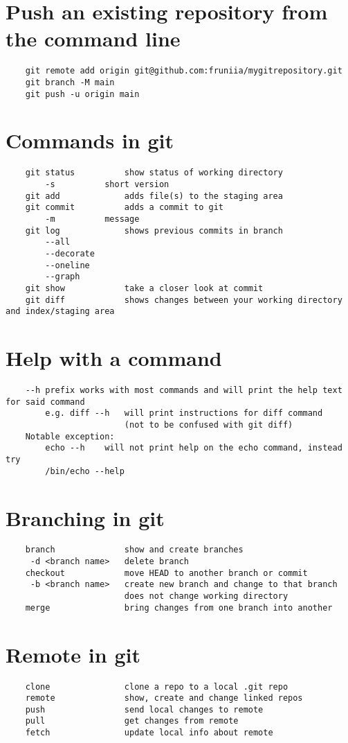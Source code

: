\documentclass[10pt, a4paper]{article}
\begin{document}
\section*{Push an existing repository from the command line}
\begin{verbatim}
    git remote add origin git@github.com:fruniia/mygitrepository.git
    git branch -M main
    git push -u origin main
\end{verbatim}
\newpage
\section*{Commands in git}
\begin{verbatim}
    git status          show status of working directory
        -s          short version
    git add             adds file(s) to the staging area
    git commit          adds a commit to git
        -m          message
    git log             shows previous commits in branch
        --all
        --decorate
        --oneline
        --graph
    git show            take a closer look at commit
    git diff            shows changes between your working directory and index/staging area
\end{verbatim}
\section*{Help with a command}
\begin{verbatim}
    --h prefix works with most commands and will print the help text for said command
        e.g. diff --h   will print instructions for diff command 
                        (not to be confused with git diff)
    Notable exception:
        echo --h    will not print help on the echo command, instead try
        /bin/echo --help    
\end{verbatim}
\section*{Branching in git}
\begin{verbatim}
    branch              show and create branches
     -d <branch name>   delete branch          
    checkout            move HEAD to another branch or commit
     -b <branch name>   create new branch and change to that branch
                        does not change working directory
    merge               bring changes from one branch into another
\end{verbatim}
\section*{Remote in git}
\begin{verbatim}
    clone               clone a repo to a local .git repo     
    remote              show, create and change linked repos
    push                send local changes to remote
    pull                get changes from remote
    fetch               update local info about remote
\end{verbatim}
\end{document}
